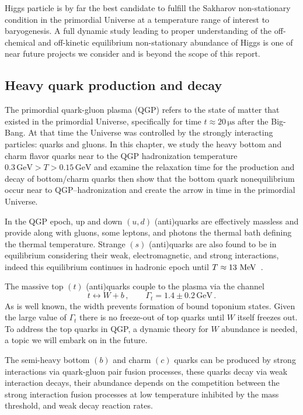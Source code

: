 Higgs particle is by far the best candidate to fulfill the Sakharov non-stationary condition in the primordial Universe at a temperature range of interest to baryogenesis. A full dynamic study leading to proper understanding of the off-chemical and off-kinetic equilibrium non-stationary abundance of Higgs is one of near future projects we consider and is beyond the scope of this report. 

\subsection{Heavy quark production and decay}
\label{sec:heavyQ}
The primordial quark-gluon plasma (QGP) refers to the state of matter that existed in the primordial Universe, specifically for time $t\approx 20\, \mathrm{\mu s}$ after the Big-Bang. At that time the Universe was controlled by the strongly interacting particles: quarks and gluons. In this chapter, we study the heavy bottom and charm flavor quarks near to the QGP hadronization temperature $0.3\,\mathrm{GeV}>T>0.15\,\mathrm{GeV}$ and examine the relaxation time for the production and decay of bottom/charm quarks then show that the bottom quark nonequilibrium occur near to QGP–hadronization and create the arrow in time in the primordial Universe.
 
In the QGP epoch, up and down $(u,d)$ (anti)quarks are effectively massless and provide along with gluons, some leptons, and photons the thermal bath defining the thermal temperature. Strange $(s)$ (anti)quarks are also found to be in equilibrium considering their weak, electromagnetic, and strong interactions, indeed this equilibrium continues in hadronic epoch until $T\approx13\text{ MeV}$~\cite{Yang:2021bko}. 

The massive top $(t)$ (anti)quarks couple to the plasma via the channel~\cite{ParticleDataGroup:2018ovx}
\begin{equation}
t\leftrightarrow W+b\,,\qquad \Gamma_t=1.4\pm0.2\,\mathrm{GeV}\,.
\end{equation}
As is well known, the width prevents formation of bound toponium states. Given the large value of $\Gamma_t$ there is no freeze-out of top quarks until $W$ itself freezes out. To address the top quarks in QGP, a dynamic theory for $W$ abundance is needed, a topic we will embark on in the future. 
 
The semi-heavy bottom $(b)$ and charm $(c)$ quarks can be produced by strong interactions via quark-gluon pair fusion processes, these quarks decay via weak interaction decays, their abundance depends on the competition between the strong interaction fusion processes at low temperature inhibited by the mass threshold, and weak decay reaction rates.

